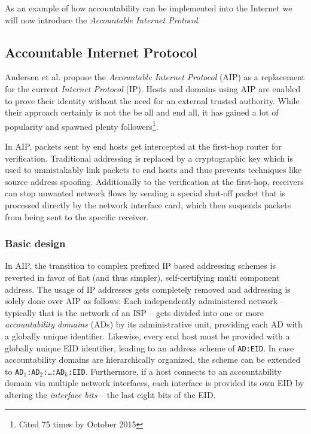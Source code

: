 \documentclass{acm_proc_article-sp}
\begin{document}
As an example of how accountability can be implemented into the Internet we will now introduce the \emph{Accountable Internet Protocol}.


\subsection{Accountable Internet Protocol}
\label{sec:aip}
Andersen et al. propose the \emph{Accountable Internet Protocol} (AIP) \cite{aip} as a replacement for the current \emph{Internet Protocol} (IP). Hosts and domains using AIP are enabled to prove their identity without the need for an external trusted authority. While their approach certainly is not the be all and end all, it has gained a lot of popularity and spawned plenty followers\footnote{Cited 75 times by October 2015}.

In AIP, packets sent by end hosts get intercepted at the first-hop router for verification. Traditional addressing is replaced by a cryptographic key which is used to unmistakably link packets to end hosts and thus prevents techniques like source address spoofing. Additionally to the verification at the first-hop, receivers can stop unwanted network flows by sending a special shut-off packet that is processed directly by the network interface card, which then suspends packets from being sent to the specific receiver.

\subsubsection{Basic design}
\label{sec:aipbd}

In AIP, the transition to complex prefixed IP based addressing schemes is reverted in favor of flat (and thus simpler), self-certifying multi component address. The usage of IP addresses gets completely removed and addressing is solely done over AIP as follows: Each independently administered network -- typically that is the network of an ISP -- gets divided into one or more \emph{accountability domains} (ADs) by its administrative unit, providing each AD with a globally unique identifier. Likewise, every end host must be provided with a globally unique EID identifier, leading to an address scheme of \texttt{AD:EID}. In case accountability domains are hierarchically organized, the scheme can be extended to \texttt{AD$_1$:AD$_2$:\ldots:AD$_k$:EID}. Furthermore, if a host connects to an accountability domain via multiple network interfaces, each interface is provided its own EID by altering the \emph{interface bits} -- the last eight bits of the EID.
\end{document}
